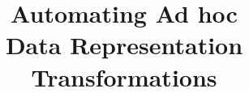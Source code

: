 \documentclass[runningheads,a4paper]{style/llncs}
\begin{document}
\mainmatter
\title{Automating Ad hoc \\Data Representation Transformations}
\author{}
\institute{}
\maketitle


% 











\end{document}
